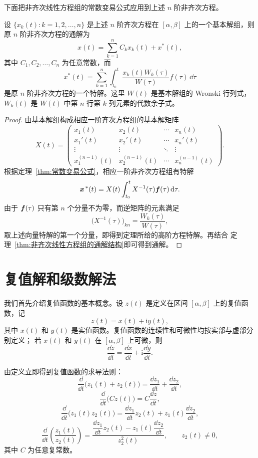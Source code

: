 下面把非齐次线性方程组的常数变易公式应用到上述 $n$ 阶非齐次方程。

\begin{theorem}\label{thm:高阶非齐次线性方程的常数变易公式}
	设 $\{x_k(t):k=1,2,\ldots,n\}$ 是上述 $n$ 阶齐次方程在
	$[\alpha,\beta]$ 上的一个基本解组，则原 $n$ 阶非齐次方程的通解为
	\[
		x(t)=\sum_{k=1}^{n}C_kx_k(t)+x^{*}(t),
	\]
	其中 $C_1,C_2,\ldots,C_n$ 为任意常数，而
	\[
		x^{*}(t)
		=\sum_{k=1}^{n}\int_{t_0}^{t}
		\dfrac{x_k(t)W_k(\tau)}{W(\tau)}f(\tau)\,\dd\tau
	\]
	是原 $n$ 阶非齐次方程的一个特解。这里 $W(t)$ 是基本解组的
	Wronski 行列式，$W_k(t)$ 是 $W(t)$ 中第 $n$ 行第 $k$ 列元素的代数余子式。
\end{theorem}

\begin{proof}
	由基本解组构成相应一阶齐次方程组的基本解矩阵
	\[
		X(t)=
		\begin{pmatrix}
			x_1(t) & x_2(t) & \cdots & x_n(t)\\
			x_1'(t) & x_2'(t) & \cdots & x_n'(t)\\
			\vdots & \vdots & \ddots & \vdots\\
			x_1^{(n-1)}(t) & x_2^{(n-1)}(t) & \cdots & x_n^{(n-1)}(t)
		\end{pmatrix}.
	\]
	根据定理~\ref{thm:常数变易公式}，相应一阶非齐次方程组有特解
	\[
		\boldsymbol{x}^{\,*}(t)
		=X(t)\int_{t_0}^{t}X^{-1}(\tau)\boldsymbol{f}(\tau)\,\mathrm{d}\tau.
	\]
	由于 $\boldsymbol{f}(\tau)$ 只有第 $n$ 个分量不为零，而逆矩阵的元素满足
	\[
		\bigl(X^{-1}(\tau)\bigr)_{kn}
		=\dfrac{W_k(\tau)}{W(\tau)},
	\]
	取上述向量特解的第一个分量，即得到定理所给的高阶方程特解。再结合
	定理~\ref{thm:非齐次线性方程组的通解结构}即可得到通解。
\end{proof}


\section{复值解和级数解法}\label{sec:复值解和级数解法}

我们首先介绍复值函数的基本概念。设 $z(t)$ 是定义在区间
$[\alpha,\beta]$ 上的复值函数，记
\[
	z(t)=x(t)+\mathrm{i}y(t),
\]
其中 $x(t)$ 和 $y(t)$ 是实值函数。复值函数的连续性和可微性均按实部与虚部分别定义；
若 $x(t)$ 和 $y(t)$ 在 $[\alpha,\beta]$ 上可微，则
\[
	\dfrac{\dd z}{\dd t}
	=\dfrac{\dd x}{\dd t}
	+\mathrm{i}\dfrac{\dd y}{\dd t}.
\]

由定义立即得到复值函数的求导法则：
\[
	\dfrac{\dd}{\dd t}\bigl(z_1(t)+z_2(t)\bigr)
	=\dfrac{\dd z_1}{\dd t}+\dfrac{\dd z_2}{\dd t},
\]
\[
	\dfrac{\dd}{\dd t}\bigl(Cz(t)\bigr)
	=C\dfrac{\dd z}{\dd t},
\]
\[
	\dfrac{\dd}{\dd t}\bigl(z_1(t)z_2(t)\bigr)
	=\dfrac{\dd z_1}{\dd t}z_2(t)
	+z_1(t)\dfrac{\dd z_2}{\dd t},
\]
\[
	\dfrac{\dd}{\dd t}\left(\dfrac{z_1(t)}{z_2(t)}\right)
	=\dfrac{\dfrac{\dd z_1}{\dd t}z_2(t)
	-z_1(t)\dfrac{\dd z_2}{\dd t}}{z_2^2(t)},
	\qquad z_2(t)\neq 0,
\]
其中 $C$ 为任意复常数。

